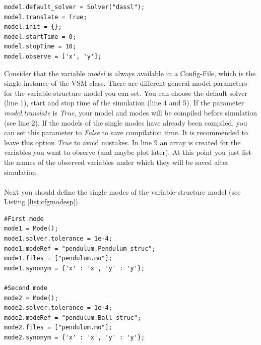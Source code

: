 \lstset{language=python}
\begin{lstlisting}[frame=htrbl, caption={Pendulum Config.py - Model Parameters}, label={list:cfgmodelp}]
model.default_solver = Solver("dassl");
model.translate = True;
model.init = {};
model.startTime = 0;
model.stopTime = 10;
model.observe = ['x', 'y'];
\end{lstlisting}

Consider that the variable \textit{model} is always available in a Config-File, which is the single instance of the VSM class. There are different general model parameters for the variable-structure model you can set. You can choose the default solver (line 1), start and stop time of the simulation (line 4 and 5). If the parameter \textit{model.translate} is \textit{True}, your model and modes will be compiled before simulation (see line 2). If the models of the single modes have already been compiled, you can set this parameter to \textit{False} to save compilation time. It is recommended to leave this option \textit{True} to avoid mistakes.
In line 9 an array is created for the variables you want to observe (and maybe plot later). At this point you just list the names of the observed variables under which they will be saved after simulation.\\
\\
Next you should define the single modes of the variable-structure model (see Listing \ref{list:cfgmodesp}).

\lstset{language=python}
\begin{lstlisting}[frame=htrbl, caption={Pendulum Config.py - Modes}, label={list:cfgmodesp}]
#First mode
mode1 = Mode();
mode1.solver.tolerance = 1e-4;
mode1.modeRef = "pendulum.Pendulum_struc";
mode1.files = ["pendulum.mo"];
mode1.synonym = {'x' : 'x', 'y' : 'y'};

#Second mode
mode2 = Mode();
mode2.solver.tolerance = 1e-4;
mode2.modeRef = "pendulum.Ball_struc";
mode2.files = ["pendulum.mo"];
mode2.synonym = {'x' : 'x', 'y' : 'y'};
\end{lstlisting}

